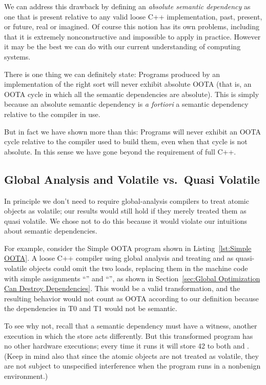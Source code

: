 We can address this drawback by defining an \emph{absolute semantic
dependency} as one that is present relative to any valid loose C++
implementation, past, present, or future, real or imagined.
Of course this notion has its own problems, including that it is
extremely nonconstructive and impossible to apply in practice.
However it may be the best we can do with our current understanding
of computing systems.

There is one thing we can definitely state:
Programs produced by an implementation of the right sort will never
exhibit absolute OOTA (that is, an OOTA cycle in which all the
semantic dependencies are absolute).
This is simply because an absolute semantic dependency is {\it
a fortiori\/} a semantic dependency relative to the compiler in use.

But in fact we have shown more than this:
Programs will never exhibit an OOTA cycle relative to the compiler
used to build them, even when that cycle is not absolute.
In this sense we have gone beyond the requirement of full C++.

\subsection{Global Analysis and Volatile vs.\ Quasi Volatile}
\label{sec:Global Analysis and Volatile vs. Quasi Volatile}

In principle we don't need to require global-analysis compilers to
treat atomic objects as volatile; our results would still hold if they
merely treated them as quasi volatile.
We chose not to do this because it would violate our intuitions about
semantic dependencies.

For example, consider the Simple OOTA program shown in
Listing~\ref{lst:Simple OOTA}.
A loose C++ compiler using global analysis and treating  and  as
quasi-volatile objects could omit the two loads, replacing them in the
machine code with simple assignments ``'' and
``'', as shown in
Section~\ref{sec:Global Optimization Can Destroy Dependencies}.
This would be a valid transformation, and the resulting behavior would
not count as OOTA according to our definition because the
dependencies in T0 and T1 would not be semantic.

To see why not, recall that a semantic dependency must have a witness,
another execution in which the store acts differently.
But this transformed program has no other hardware executions; every time it
runs it will store 42 to both  and .
(Keep in mind also that since the atomic objects are not treated as
volatile, they are not subject to unspecified interference when the
program runs in a nonbenign environment.)

